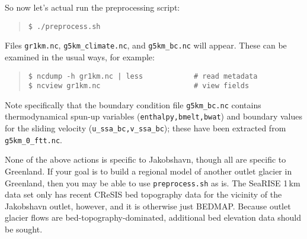 So now let's actual run the preprocessing script:
\begin{quote}\small
\begin{verbatim}
$ ./preprocess.sh
\end{verbatim}
\normalsize\end{quote}
Files \texttt{gr1km.nc}, \texttt{g5km_climate.nc}, and \texttt{g5km_bc.nc} will appear.  These can be examined in the usual ways, for example:
\begin{quote}\small
\begin{verbatim}
$ ncdump -h gr1km.nc | less            # read metadata
$ ncview gr1km.nc                      # view fields
\end{verbatim}
\normalsize\end{quote}
Note specifically that the boundary condition file \texttt{g5km_bc.nc} contains thermodynamical spun-up variables (\texttt{enthalpy,bmelt,bwat}) and boundary values for the sliding velocity (\texttt{u_ssa_bc,v_ssa_bc}); these have been extracted from \texttt{g5km_0_ftt.nc}.

None of the above actions is specific to Jakobshavn, though all are specific to Greenland.  If your goal is to build a regional model of another outlet glacier in Greenland, then you may be able to use \texttt{preprocess.sh} as is.  The SeaRISE 1\,km data set only has recent CReSIS bed topography data for the vicinity of the Jakobshavn outlet, however, and it is otherwise just BEDMAP.  Because outlet glacier flows are bed-topography-dominated, additional bed elevation data should be sought.

